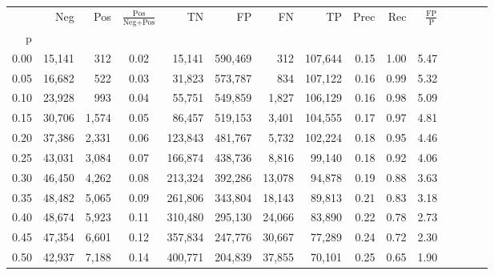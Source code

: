 \begin{tabular}{rrrcrrrrrrrrrrr}
\toprule
{} &     Neg &    Pos & $\frac{\text{Pos}}{\text{Neg}+\text{Pos}}$ &       TN &       FP &       FN &       TP &  Prec &   Rec & $\frac{\text{FP}}{\text{P}}$ \\
p    &         &        &                                            &          &          &          &          &       &       &                              \\
\midrule
0.00 &  15,141 &    312 &                                       0.02 &   15,141 &  590,469 &      312 &  107,644 &  0.15 &  1.00 &                         5.47 \\
0.05 &  16,682 &    522 &                                       0.03 &   31,823 &  573,787 &      834 &  107,122 &  0.16 &  0.99 &                         5.32 \\
0.10 &  23,928 &    993 &                                       0.04 &   55,751 &  549,859 &    1,827 &  106,129 &  0.16 &  0.98 &                         5.09 \\
0.15 &  30,706 &  1,574 &                                       0.05 &   86,457 &  519,153 &    3,401 &  104,555 &  0.17 &  0.97 &                         4.81 \\
0.20 &  37,386 &  2,331 &                                       0.06 &  123,843 &  481,767 &    5,732 &  102,224 &  0.18 &  0.95 &                         4.46 \\
0.25 &  43,031 &  3,084 &                                       0.07 &  166,874 &  438,736 &    8,816 &   99,140 &  0.18 &  0.92 &                         4.06 \\
0.30 &  46,450 &  4,262 &                                       0.08 &  213,324 &  392,286 &   13,078 &   94,878 &  0.19 &  0.88 &                         3.63 \\
0.35 &  48,482 &  5,065 &                                       0.09 &  261,806 &  343,804 &   18,143 &   89,813 &  0.21 &  0.83 &                         3.18 \\
0.40 &  48,674 &  5,923 &                                       0.11 &  310,480 &  295,130 &   24,066 &   83,890 &  0.22 &  0.78 &                         2.73 \\
0.45 &  47,354 &  6,601 &                                       0.12 &  357,834 &  247,776 &   30,667 &   77,289 &  0.24 &  0.72 &                         2.30 \\
0.50 &  42,937 &  7,188 &                                       0.14 &  400,771 &  204,839 &   37,855 &   70,101 &  0.25 &  0.65 &                         1.90 \\

\end{tabular}
